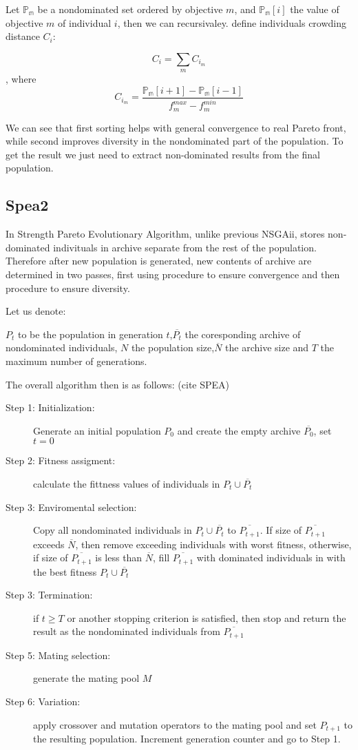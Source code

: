 \documentclass[12pt,oneside,draft]{fithesis2}
\begin{document}
Let $\mathbb{P_m}$ be a nondominated set ordered by objective $m$, and $\mathbb{P_m}[i]$ the value of objective $m$ of individual $i$, then we can recursivaley. define individuals crowding distance $C_i$:

$$C_i = \sum\limits_{m} C_i_m $$, where $$C_i_m = \frac{\mathbb{P_m}[i+1] - \mathbb{P_m}[i-1]}{f^{max}_m - f^{min}_m}$$




We can see that first sorting helps with general convergence to real Pareto front, while second improves diversity in the nondominated part of the population. To get the result we just need to extract non-dominated results from the final population. 

\subsection{Spea2}
In Strength Pareto Evolutionary Algorithm, unlike previous NSGAii, stores non-dominated indivituals in archive separate from the rest of the population. Therefore after new population is generated, new contents of archive are determined in two passes, first using procedure to ensure convergence and then procedure to ensure diversity.

Let us denote:

$P_t$ to be the population in generation $t$,$\overline{P_t}$ the coresponding archive of nondominated individuals, $N$ the population size,$\overline N$ the archive size and $T$ the maximum number of generations.

The overall algorithm then is as follows: (cite SPEA)

\begin{description}
	\item[Step 1: Initialization:] Generate an initial population $P_0$ and create the empty archive $\overline{P_0}$, set $t=0$
	\item[Step 2: Fitness assigment:] calculate the fittness values of individuals in $P_t \cup \overline{P_t}$
	\item[Step 3: Enviromental selection:] Copy all nondominated individuals in $P_t \cup \overline{P_t}$ to $\overline{P_{t+1}}$. If size of $\overline{P_{t+1}}$ exceeds $\overline N$, then remove exceeding individuals with worst fitness, otherwise, if size of $\overline{P_{t+1}}$ is less than $\overline N$, fill $\overline{P_{t+1}}$ with dominated individuals in  with the best fitness $P_t \cup \overline{P_t}$
	\item[Step 3: Termination:] if $t \geq T$ or another stopping criterion is satisfied, then stop and return the result as the nondominated individuals from $\overline{P_{t+1}}$
	\item[Step 5: Mating selection:] generate the mating pool $M$
	\item[Step 6: Variation:] apply crossover and mutation operators to the mating pool and set $P_{t+1}$ to the resulting population. Increment generation counter and go to Step 1.
\end{description}
\end{document}
